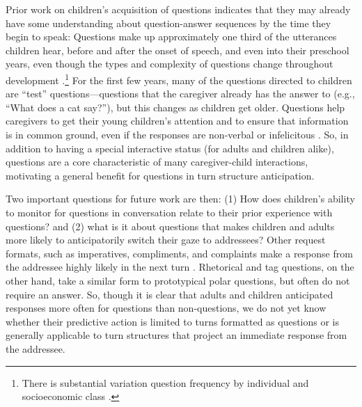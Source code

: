 \documentclass[authoryear, 12pt]{elsarticle}
\begin{document}
Prior work on children's acquisition of questions indicates that they may already have some understanding about question-answer sequences by the time they begin to speak: Questions make up approximately one third of the utterances children hear, before and after the onset of speech, and even into their preschool years, even though the types and complexity of questions change throughout development \citep{casillas2016, fitneva2012, henning2005, shatz1979}.\footnote{There is substantial variation question frequency by individual and socioeconomic class \citep{hart1992}.} For the first few years, many of the questions directed to children are ``test'' questions---questions that the caregiver already has the answer to (e.g., ``What does a cat say?''), but this changes as children get older. Questions help caregivers to get their young children's attention and to ensure that information is in common ground, even if the responses are non-verbal or infelicitous \citep{bruner1985, fitneva2012, snow1977}. So, in addition to having a special interactive status (for adults and children alike), questions are a core characteristic of many caregiver-child interactions, motivating a general benefit for questions in turn structure anticipation.

Two important questions for future work are then: (1) How does children's ability to monitor for questions in conversation relate to their prior experience with questions? and (2) what is it about questions that makes children and adults more likely to anticipatorily switch their gaze to addressees? Other request formats, such as imperatives, compliments, and complaints make a response from the addressee highly likely in the next turn \citep{schegloff2007}. Rhetorical and tag questions, on the other hand, take a similar form to prototypical polar questions, but often do not require an answer. So, though it is clear that adults and children anticipated responses more often for questions than non-questions, we do not yet know whether their predictive action is limited to turns formatted as questions or is generally applicable to turn structures that project an immediate response from the addressee. 

\end{document}
